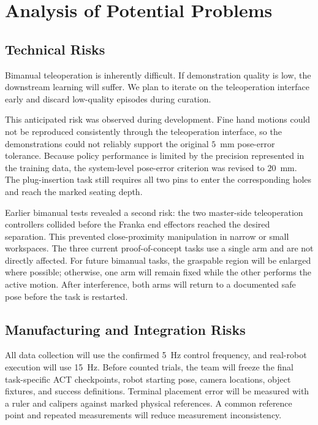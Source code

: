 \documentclass[12pt, letterpaper]{article}
\newcommand{\drone}[1]{{\color{gray}#1}}
\begin{document}
\section{Analysis of Potential Problems}

\subsection{Technical Risks}

\drone{Bimanual teleoperation is inherently difficult. If demonstration
quality is low, the downstream learning will suffer. We plan to iterate on the
teleoperation interface early and discard low-quality episodes during
curation.}

This anticipated risk was observed during development. Fine hand motions could
not be reproduced consistently through the teleoperation interface, so the
demonstrations could not reliably support the original $5$~mm pose-error
tolerance. Because policy performance is limited by the precision represented
in the training data, the system-level pose-error criterion was revised to
$20$~mm. The plug-insertion task still requires all two pins to enter the
corresponding holes and reach the marked seating depth.

Earlier bimanual tests revealed a second risk: the two master-side
teleoperation controllers collided before the Franka end effectors reached the
desired separation. This prevented close-proximity manipulation in narrow or
small workspaces. The three current proof-of-concept tasks use a single arm and
are not directly affected. For future bimanual tasks, the graspable region will
be enlarged where possible; otherwise, one arm will remain fixed while the
other performs the active motion. After interference, both arms will return to
a documented safe pose before the task is restarted.

\subsection{Manufacturing and Integration Risks}

All data collection will use the confirmed 5~Hz
control frequency, and real-robot execution will use 15~Hz. Before counted trials, the team will freeze the final
task-specific ACT checkpoints, robot starting pose, camera locations, object
fixtures, and success definitions. Terminal placement error will be measured
with a ruler and calipers against marked physical references. A common
reference point and repeated measurements will reduce measurement inconsistency.
\end{document}
